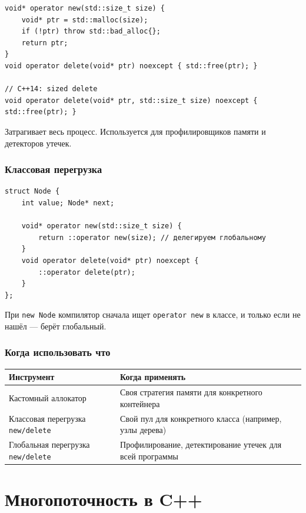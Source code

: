 \documentclass[a4paper,12pt]{article}
\begin{document}
\begin{lstlisting}
void* operator new(std::size_t size) {
    void* ptr = std::malloc(size);
    if (!ptr) throw std::bad_alloc{};
    return ptr;
}
void operator delete(void* ptr) noexcept { std::free(ptr); }

// C++14: sized delete
void operator delete(void* ptr, std::size_t size) noexcept { std::free(ptr); }
\end{lstlisting}

Затрагивает весь процесс. Используется для профилировщиков памяти и
детекторов утечек.

\subsubsection{Классовая перегрузка}

\begin{lstlisting}
struct Node {
    int value; Node* next;

    void* operator new(std::size_t size) {
        return ::operator new(size); // делегируем глобальному
    }
    void operator delete(void* ptr) noexcept {
        ::operator delete(ptr);
    }
};
\end{lstlisting}

При \texttt{new Node} компилятор сначала ищет \texttt{operator new}
в классе, и только если не нашёл --- берёт глобальный.

\subsubsection{Когда использовать что}

\begin{center}
\begin{tabular}{lp{7.5cm}}
\toprule
\textbf{Инструмент} & \textbf{Когда применять} \\
\midrule
Кастомный аллокатор
    & Своя стратегия памяти для конкретного контейнера \\
\addlinespace
Классовая перегрузка \texttt{new/delete}
    & Свой пул для конкретного класса (например, узлы дерева) \\
\addlinespace
Глобальная перегрузка \texttt{new/delete}
    & Профилирование, детектирование утечек для всей программы \\
\bottomrule
\end{tabular}
\end{center}

\newpage
\section{Многопоточность в C++}
\end{document}
